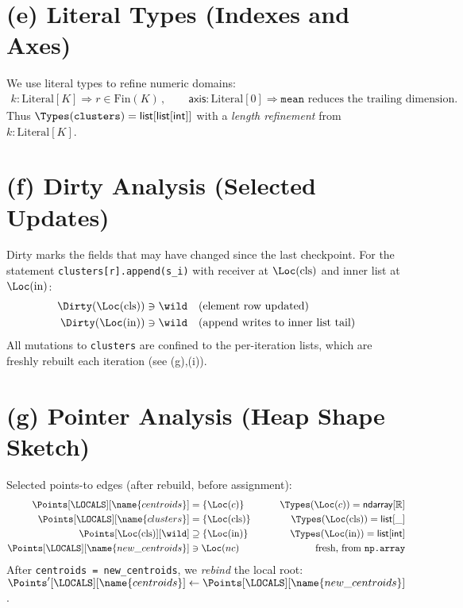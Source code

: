 \section*{(e) Literal Types (Indexes and Axes)}
We use literal types to refine numeric domains:
\begin{align*}
k : \mathrm{Literal}[K] \Rightarrow r \in \mathrm{Fin}(K)\,,\qquad
\textsf{axis} : \mathrm{Literal}[0] \Rightarrow \texttt{mean} \text{ reduces the trailing dimension.}
\end{align*}
Thus $\Types(\texttt{clusters}) = \textsf{list}[\textsf{list}[\textsf{int}]]$ with a \emph{length refinement} from $k: \mathrm{Literal}[K]$.

\section*{(f) Dirty Analysis (Selected Updates)}
Dirty marks the fields that may have changed since the last checkpoint.
For the statement \texttt{clusters[r].append(s\_i)} with receiver at $\Loc(\mathrm{cls})$ and inner list at $\Loc(\mathrm{in})$:
\begin{align*}
\Dirty(\Loc(\mathrm{cls})) &\ni \wild \quad\text{(element row updated)}\\
\Dirty(\Loc(\mathrm{in})) &\ni \wild \quad\text{(append writes to inner list tail)}
\end{align*}
All mutations to \texttt{clusters} are confined to the per-iteration lists, which are freshly rebuilt each iteration (see (g),(i)).

\section*{(g) Pointer Analysis (Heap Shape Sketch)}
Selected points-to edges (after rebuild, before assignment):
\begin{align*}
\Points[\LOCALS][\name{centroids}] &= \{\Loc(c)\} \qquad &\Types(\Loc(c)) = \textsf{ndarray}[\mathbb{R}]\\
\Points[\LOCALS][\name{clusters}] &= \{\Loc(\mathrm{cls})\} \qquad &\Types(\Loc(\mathrm{cls})) = \textsf{list}[\_]\\
\Points[\Loc(\mathrm{cls})][\wild] &\supseteq \{\Loc(\mathrm{in})\} \qquad &\Types(\Loc(\mathrm{in})) = \textsf{list}[\textsf{int}]\\
\Points[\LOCALS][\name{new\_centroids}] &\ni \Loc(nc) \qquad &\text{fresh, from }\texttt{np.array}
\end{align*}
After \texttt{centroids = new\_centroids}, we \emph{rebind} the local root:
\(\Points'[\LOCALS][\name{centroids}] \leftarrow \Points[\LOCALS][\name{new\_centroids}]\).

